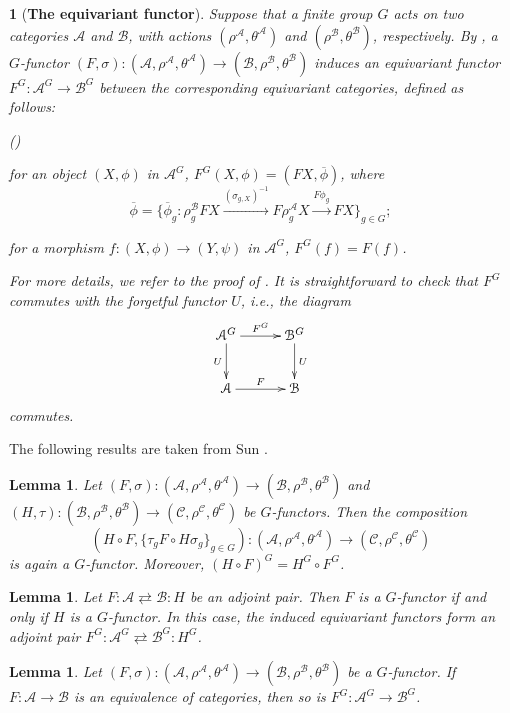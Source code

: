 \documentclass[12pt,twoside]{amsart}
\theoremstyle{bfupright head,slanted body}
\theoremstyle{bfupright head,upright body}
\newtheorem{bfhpg}[res]{}               \newtheorem*{bfhpg*}{}
\theoremstyle{fixed bf head,slanted body}
\newtheorem{lem}[res]{Lemma}            \newtheorem*{lem*}{Lemma}
\theoremstyle{fixed bf head,upright body}
\theoremstyle{numbered paragraph}
\newlength{\thmlistleft}        %
\newlength{\thmlistright}       %
\newlength{\thmlistpartopsep}   %
\newlength{\thmlisttopsep}      %
\newlength{\thmlistparsep}      %
\newlength{\thmlistitemsep}     %
\newcounter{rqm}
\newenvironment{rqm}{\begin{list}{\upshape (\arabic{rqm})}%
    {\usecounter{rqm}%
      \setlength{\leftmargin}{\thmlistleft}%
      \setlength{\labelwidth}{\thmlistleft}%
      \setlength{\rightmargin}{\thmlistright}%
      \setlength{\partopsep}{\thmlistpartopsep}%
      \setlength{\topsep}{\thmlisttopsep}%
      \setlength{\parsep}{\thmlistparsep}%
      \setlength{\itemsep}{\thmlistitemsep}}}%
  {\end{list}}%
\numberwithin{equation}{res}
\newcommand{\calC}{\mathcal{C}}
\newcommand{\calA}{\mathcal{A}}
\newcommand{\calB}{\mathcal{B}}
\begin{document}
\begin{bfhpg}[\bf The equivariant functor] \label{equi fun}
Suppose that a finite group $G$ acts on two categories $\calA$ and $\calB$, with actions \((\rho^\calA,\theta^\calA)\) and \((\rho^\calB,\theta^\calB)\), respectively.
By \cite[Lemma 2.9]{2025Equ}, a \(G\)-functor \((F,\sigma):(\calA,\rho^\calA,\theta^\calA)\to(\calB,\rho^\calB,\theta^\calB)\) induces an \emph{equivariant functor} \(F^G:\calA^G\to\calB^G\) between the corresponding equivariant categories, defined as follows:
\begin{rqm}
\item[\(\bullet\)] for an object \((X,\phi)\) in \(\calA^G\), \(F^G(X,\phi)=(FX,\overline{\phi})\), where
\[
\overline{\phi}=\{\overline{\phi}_g:\rho^\calB_g FX
\overset{(\sigma_{g,X})^{-1}}{\longrightarrow} F\rho^\calA_g X
\overset{F\phi_g}{\longrightarrow} FX\}_{g\in G};
\]
\item[\(\bullet\)] for a morphism \(f:(X,\phi)\to(Y,\psi)\) in \(\calA^G\), \(F^G(f)=F(f)\).
\end{rqm}
For more details, we refer to the proof of \cite[Lemma 2.9]{2025Equ}.
It is straightforward to check that \(F^G\) commutes with the forgetful functor \(U\), i.e., the diagram
\[
\xymatrix@C=1cm{
   \calA^G
\ar[r]^-{F^G}
\ar[d]_-{U}
&  \calB^G
\ar[d]^-{U} \\
   \calA
\ar[r]^-{F}
&  \calB
}
\]
commutes.
\end{bfhpg}

The following results are taken from Sun \cite{2019Sun}.

\begin{lem} \label{G-fun comp}
Let \((F,\sigma):(\calA,\rho^\calA,\theta^\calA)\to(\calB,\rho^\calB,\theta^\calB)\) and \((H,\tau):(\calB,\rho^\calB,\theta^\calB)\to(\calC,\rho^\calC,\theta^\calC)\) be \(G\)-functors.
Then the composition
\[
(H\circ F,\{\tau_g F \circ H\sigma_g\}_{g\in G}):
(\calA,\rho^\calA,\theta^\calA)\to(\calC,\rho^\calC,\theta^\calC)
\]
is again a \(G\)-functor.
Moreover, \((H\circ F)^G = H^G\circ F^G\).
\end{lem}

\begin{lem} \label{G-frobenius pair}
Let $F : \calA \rightleftarrows \calB : H$ be an adjoint pair.
Then $F$ is a $G$-functor if and only if $H$ is a $G$-functor. In this case, the induced equivariant functors form an adjoint pair $F^G : \calA^G \rightleftarrows \calB^G : H^G$.
\end{lem}

\begin{lem} \label{G-equivalence}
Let \((F,\sigma):(\calA,\rho^\calA,\theta^\calA)\to(\calB,\rho^\calB,\theta^\calB)\) be a \(G\)-functor.
If \(F:\calA\to\calB\) is an equivalence of categories, then so is \(F^G:\calA^G\to\calB^G\).
\end{lem}
\end{document}
